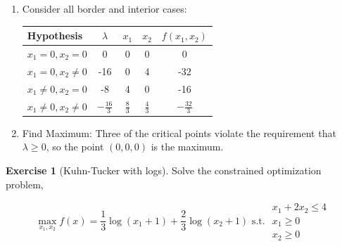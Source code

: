 \documentclass[
]{book}
\providecommand{\tightlist}{%
  \setlength{\itemsep}{0pt}\setlength{\parskip}{0pt}}
\theoremstyle{definition}
\theoremstyle{definition}
\theoremstyle{definition}
\newtheorem{exercise}{Exercise}[chapter]
\theoremstyle{definition}
\theoremstyle{remark}
\begin{document}
\begin{enumerate}
\def\labelenumi{\arabic{enumi}.}
\setcounter{enumi}{2}
\tightlist
\item
  Consider all border and interior cases:

  \begin{center}
  \begin{tabular}{|l|ccc|c|}
  \hline
  Hypothesis  & $\lambda$& $x_1$ & $x_2$ & $f(x_1, x_2)$\\
  \hline
  $x_1 = 0, x_2 = 0$  &0 & 0 & 0 & 0\\
  $x_1 = 0, x_2 \neq 0$  &-16 & 0 & 4 & -32\\
  $x_1 \neq 0, x_2 = 0$  &-8 & 4 & 0 & -16\\
  $x_1 \neq 0, x_2 \neq 0$ & $-\frac{16}{3}$ & $\frac{8}{3}$ & $\frac{4}{3}$ & $-\frac{32}{3}$\\
  \hline
  \end{tabular}
  \end{center}
\item
  Find Maximum:
  Three of the critical points violate the requirement that \(\lambda \geq 0\), so the point \((0,0,0)\) is the maximum.
\end{enumerate}

\begin{exercise}[Kuhn-Tucker with logs]
\protect\hypertarget{exr:unnamed-chunk-251}{}{\label{exr:unnamed-chunk-251} {} }Solve the constrained optimization problem,

\[\max_{x_1,x_2} f(x) = \frac{1}{3}\log (x_1 + 1) + \frac{2}{3}\log (x_2 + 1) \text{ s.t. }  
\begin{array}{l}
x_1 + 2x_2 \leq 4\\
     x_1 \geq 0\\
    x_2 \geq 0
\end{array}\]
\end{exercise}
\end{document}
